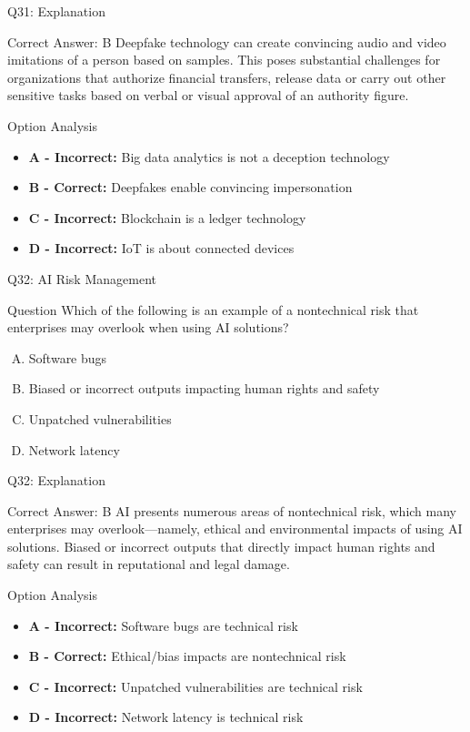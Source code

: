 \documentclass{beamer}
\begin{document}
	\begin{frame}{Q31: Explanation}
		\begin{block}{Correct Answer: B}
			Deepfake technology can create convincing audio and video imitations of a person based on samples. This poses substantial challenges for organizations that authorize financial transfers, release data or carry out other sensitive tasks based on verbal or visual approval of an authority figure.
		\end{block}
		\begin{block}{Option Analysis}
			\begin{itemize}
				\item \textbf{A - Incorrect:} Big data analytics is not a deception technology
				\item \textbf{B - Correct:} Deepfakes enable convincing impersonation
				\item \textbf{C - Incorrect:} Blockchain is a ledger technology
				\item \textbf{D - Incorrect:} IoT is about connected devices
			\end{itemize}
		\end{block}
	\end{frame}
	
	\begin{frame}{Q32: AI Risk Management}
		\begin{block}{Question}
			Which of the following is an example of a nontechnical risk that enterprises may overlook when using AI solutions?
		\end{block}
		\begin{enumerate}[(A)]
			\item Software bugs
			\item Biased or incorrect outputs impacting human rights and safety
			\item Unpatched vulnerabilities
			\item Network latency
		\end{enumerate}
	\end{frame}
	
	\begin{frame}{Q32: Explanation}
		\begin{block}{Correct Answer: B}
			AI presents numerous areas of nontechnical risk, which many enterprises may overlook—namely, ethical and environmental impacts of using AI solutions. Biased or incorrect outputs that directly impact human rights and safety can result in reputational and legal damage.
		\end{block}
		\begin{block}{Option Analysis}
			\begin{itemize}
				\item \textbf{A - Incorrect:} Software bugs are technical risk
				\item \textbf{B - Correct:} Ethical/bias impacts are nontechnical risk
				\item \textbf{C - Incorrect:} Unpatched vulnerabilities are technical risk
				\item \textbf{D - Incorrect:} Network latency is technical risk
			\end{itemize}
		\end{block}
	\end{frame}
	
\end{document}
